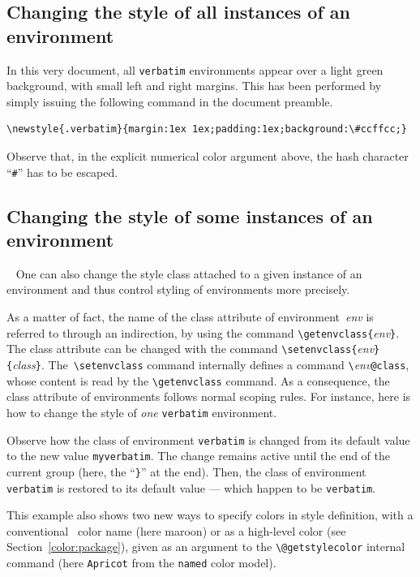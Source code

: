 \subsection{Changing \label{css:change:all}
the style of all instances of an environment}

In this very document, all \texttt{verbatim} environments appear over
a light green background, with small left and right margins.
This has been performed by simply issuing the following command in
the document preamble.
\begin{verbatim}
\newstyle{.verbatim}{margin:1ex 1ex;padding:1ex;background:\#ccffcc;}
\end{verbatim}
Observe that, in the explicit numerical color argument above, the
hash character ``\texttt{\#}'' has to be escaped.

\subsection{Changing \label{css:change}the style of some instances of an environment}\
%
One can also change the style class  attached to a given instance of
an environment and thus control styling of environments more precisely.

As a matter of fact, the name of the class attribute of
environment~\textit{env} is referred to through an indirection, by
using the command \verb+\getenvclass{+\textit{env}\verb+}+.
The class attribute can be changed with the command
\verb+\setenvclass{+\textit{env}\verb+}{+\textit{class}\verb+}+.
The~\verb+\setenvclass+ command internally defines a command
\verb+\+\textit{env}\verb+@class+, whose content is read
by the \verb+\getenvclass+ command. As a consequence, the class
attribute of environments follows normal scoping rules.
\label{getstylecolor:example}
For instance, here is how to change the style of \emph{one} \texttt{verbatim}
environment.
\bgroup{}

\egroup
Observe how the class of environment \texttt{verbatim} is changed from
its default value to the
new value \texttt{myverbatim}. The change remains active until the
end of the current group (here, the ``\texttt{\}}'' at the end). Then, the class
of environment \texttt{verbatim} is restored to its default value
--- which happen to be \texttt{verbatim}.

This example also shows two new ways to specify colors in style
definition, with a
conventional \html~color name (here {\ifhevea\maroon\fi maroon}) or as
a high-level color (see Section~\ref{color:package}), given as an argument to
the \verb+\@getstylecolor+ internal command
(here \colorbox{abricot}{\texttt{Apricot}} from the \texttt{named} color model).

